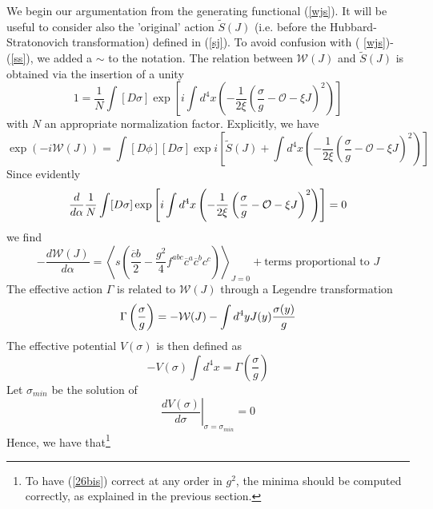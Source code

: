 \documentclass[a4paper,12pt]{article}
\begin{document}
\label{sec4} We begin our argumentation from the generating
functional (\ref {wjs}). It will be useful to consider also the
'original' action $\widetilde{S}(J)$ (i.e. before the
Hubbard-Stratonovich
transformation) defined in (\ref{sj}). To avoid confusion with (%
\ref{wjs})-(\ref{ss}), we added a $\sim$ to the notation. The relation
between $\mathcal{W}(J)$ and $\widetilde{S}(J)$ is obtained via the
insertion of a unity
\begin{equation}  \label{19}
1=\frac{1}{N}\int [D\sigma]\exp\left[i\int d^{4}x\left(-\frac{1}{2\xi}\left(%
\frac{\sigma}{g}-\mathcal{O}-\xi J\right)^{2}\right)\right]
\end{equation}
with $N$ an appropriate normalization factor. Explicitly, we have
\begin{equation}  \label{20}
\exp(-i\mathcal{W}(J))=\int[D\phi][D\sigma]\exp i\left[\widetilde{S}(J)+\int
d^{4}x\left(-\frac{1}{2\xi}\left(\frac{\sigma}{g}-\mathcal{O}-\xi
J\right)^{2}\right)\right]
\end{equation}
Since evidently
\begin{equation}  \label{23}
\frac{d}{d\alpha}\frac{1}{N}\int [D\sigma]\exp\left[i\int d^{4}x\left(-\frac{%
1}{2\xi}\left(\frac{\sigma}{g}-\mathcal{O}-\xi J\right)^{2}\right)\right]=0
\end{equation}
we find
\begin{equation}  \label{24}
-\frac{d\mathcal{W}(J)}{d\alpha}=\left\langle s\left(\frac{\overline{c}b}{2}-%
\frac{g^{2}}{4}f^{abc}\overline{c}^{a}\overline{c}^{b}c^{c}\right)\right%
\rangle_{J=0}+\textrm{terms proportional to } J
\end{equation}
The effective action $\Gamma$ is related to $\mathcal{W}(J)$ through a
Legendre transformation
\begin{equation}  \label{25bis}
\Gamma\left(\frac{\sigma}{g}\right)=-\mathcal{W}(J)-\int d^{4}y J(y)\frac{%
\sigma(y)}{g}
\end{equation}
The effective potential $V(\sigma)$ is then defined as
\begin{equation}  \label{25}
-V(\sigma)\int d^{4}x=\Gamma\left(\frac{\sigma}{g}\right)
\end{equation}
Let $\sigma_{min}$ be the solution of
\begin{equation}  \label{26}
\left.\frac{dV(\sigma)}{d\sigma}\right|_{\sigma=\sigma_{min}}=0
\end{equation}
Hence, we have that\footnote{%
To have (\ref{26bis}) correct at any order in $g^{2}$, the minima should be
computed correctly, as explained in the previous section.}
\end{document}
